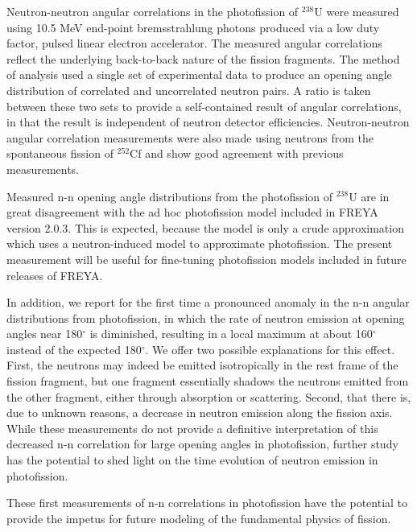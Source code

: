 Neutron-neutron angular correlations in the photofission of $^{238}$U were measured using 10.5 MeV end-point bremsstrahlung photons produced via a low duty factor, pulsed linear electron accelerator.
The measured angular correlations reflect the underlying back-to-back nature of the fission fragments.
The method of analysis used a single set of experimental data to produce an opening angle distribution of correlated and uncorrelated neutron pairs.
A ratio is taken between these two sets to provide a self-contained result of angular correlations, in that the result is independent of neutron detector efficiencies.
Neutron-neutron angular correlation measurements were also made using neutrons from the spontaneous fission of $^{252}$Cf and show good agreement with previous measurements.

Measured n-n opening angle distributions from the photofission of $^{238}$U are in great disagreement with the ad hoc photofission model included in FREYA version 2.0.3.
This is expected, because the model is only a crude approximation which uses a neutron-induced model to approximate photofission.
The present measurement will be useful for fine-tuning photofission models included in future releases of FREYA.

In addition, we report for the first time a pronounced anomaly in the n-n angular distributions from photofission, in which the rate of neutron emission at opening angles near 180$^{\circ}$ is diminished, resulting in a local maximum at about 160$^{\circ}$ instead of the expected 180$^{\circ}$.
We offer two possible explanations for this effect.
First, the neutrons may indeed be emitted isotropically in the rest frame of the fission fragment, but one fragment essentially shadows the neutrons emitted from the other fragment, either through absorption or scattering.
Second, that there is, due to unknown reasons, a decrease in neutron emission along the fission axis.
While these measurements do not provide a definitive interpretation of this decreased n-n correlation for large opening angles in photofission, further study has the potential to shed light on the time evolution of neutron emission in photofission.

These first measurements of n-n correlations in photofission have the potential to provide the impetus for future modeling of the fundamental physics of fission.
